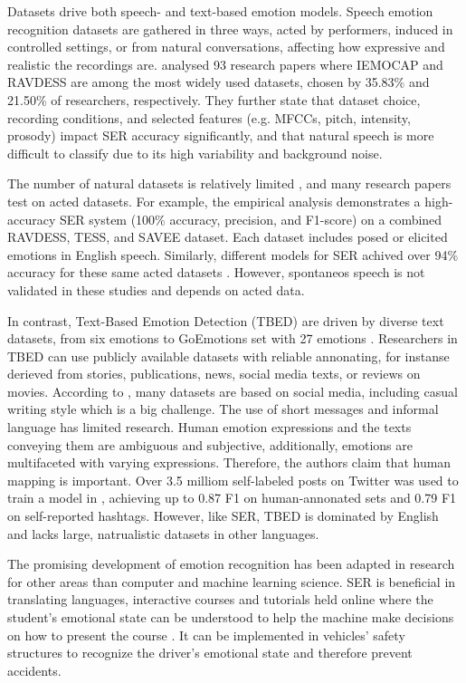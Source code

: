 Datasets drive both speech- and text-based emotion models.  Speech emotion recognition datasets are gathered in three ways, acted by performers, induced in controlled settings, or from natural conversations, affecting how expressive and realistic the recordings are. \textcite{Rathi2024} analysed 93 research papers where IEMOCAP and RAVDESS are among the most widely used datasets, chosen by 35.83\% and 21.50\% of researchers, respectively. They further state that dataset choice, recording conditions, and selected features (e.g. MFCCs, pitch, intensity, prosody) impact SER accuracy significantly, and that natural speech is more difficult to classify due to its high variability and background noise.

The number of natural datasets is relatively limited \autocite{Cai2023}, and many research papers test on acted datasets. For example, the empirical analysis \textcite{Ahammed2024} demonstrates a high-accuracy SER system (100\% accuracy, precision, and F1-score) on a combined RAVDESS, TESS, and SAVEE dataset. Each dataset includes posed or elicited emotions in English speech. Similarly, different models for SER achived over 94\% accuracy for these same acted datasets \autocite{Alroobaea2024}. However, spontaneos speech is not validated in these studies and depends on acted data. 

In contrast, Text-Based Emotion Detection (TBED) are driven by diverse text datasets, from six emotions to GoEmotions set with 27 emotions \autocite{Kusal2023}. Researchers in TBED can use publicly available datasets with reliable annonating, for instanse derieved from stories, publications, news, social media texts, or reviews on movies. According to \textcite{Kusal2023}, many datasets are based on social media, including casual writing style which is a big challenge. The use of short messages and informal language has limited research. Human emotion expressions and the texts conveying them are ambiguous and subjective, additionally, emotions are multifaceted with varying expressions. Therefore, the authors claim that human mapping is important. Over 3.5 milliom self-labeled posts on Twitter was used to train a model in \textcite{Lee2023} , achieving up to 0.87 F1 on human-annonated sets and 0.79 F1 on self-reported hashtags. However, like SER, TBED is dominated by English and lacks large, natrualistic datasets in other languages. 

The promising development of emotion recognition has been adapted in research for other areas than computer and machine learning science. SER is beneficial in translating languages, interactive courses and tutorials held online where the student’s emotional state can be understood to help the machine make decisions on how to present the course \autocite{Abbaschian2021}. It can be implemented in vehicles’ safety structures to recognize the driver’s emotional state and therefore prevent accidents. 

